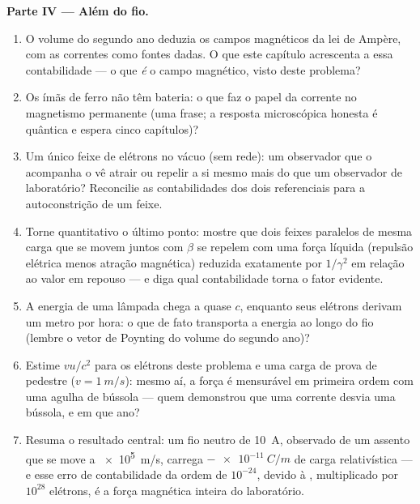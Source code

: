 \begin{problem}
\medskip\noindent\textbf{Parte IV --- Além do fio.}
\begin{enumerate}[resume]
  \item O volume do segundo ano deduzia os campos magnéticos da lei de
        Ampère, com as correntes como fontes dadas. O que este
        capítulo acrescenta a essa contabilidade --- o que \emph{é} o
        campo magnético, visto deste problema?
  \item Os ímãs de ferro não têm bateria: o que faz o papel da
        corrente no magnetismo permanente (uma frase; a resposta
        microscópica honesta é quântica e espera cinco capítulos)?
  \item Um único feixe de elétrons no vácuo (sem rede): um observador
        que o acompanha o vê atrair ou repelir a si mesmo mais do que
        um observador de laboratório? Reconcilie as contabilidades dos
        dois referenciais para a autoconstrição de um feixe.
  \item Torne quantitativo o último ponto: mostre que dois feixes
        paralelos de mesma carga que se movem juntos com $\beta$ se
        repelem com uma força líquida (repulsão elétrica menos atração
        magnética) reduzida exatamente por $1/\gamma^2$ em relação ao
        valor em repouso --- e diga qual contabilidade torna o fator
        evidente.
  \item A energia de uma lâmpada chega a quase $c$, enquanto seus
        elétrons derivam um metro por hora: o que de fato transporta a
        energia ao longo do fio (lembre o vetor de Poynting do volume
        do segundo ano)?
  \item Estime $vu/c^2$ para os elétrons deste problema e uma carga de
        prova de pedestre ($v = \qty{1}{m/s}$): mesmo aí, a força é
        mensurável em primeira ordem com uma agulha de bússola ---
        quem demonstrou que uma corrente desvia uma bússola, e em que
        ano?
  \item Resuma o resultado central: um fio neutro de \qty{10}{A},
        observado de um assento que se move a \qty{e5}{m/s}, carrega
        $-\qty{e-11}{C/m}$ de carga relativística --- e esse erro de
        contabilidade da ordem de $10^{-24}$, devido à , multiplicado por $10^{28}$ elétrons, é a força
        magnética inteira do laboratório.
\end{enumerate}
\end{problem}
